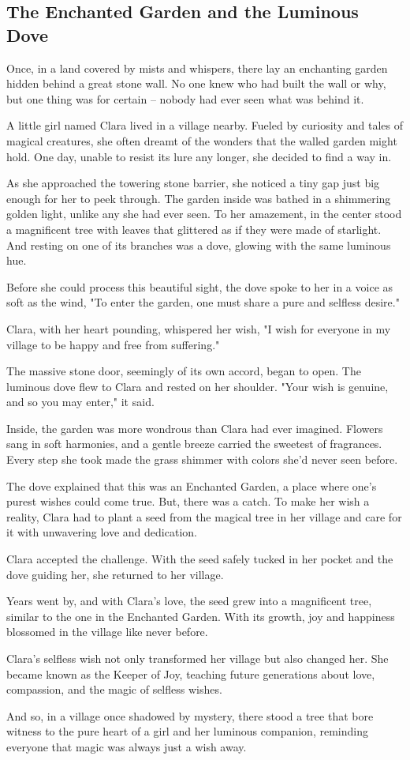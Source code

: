 \documentclass[10pt, letterpaper]{article}
\begin{document}
\subsection*{The Enchanted Garden and the Luminous Dove}

Once, in a land covered by mists and whispers, there lay an enchanting garden hidden behind a great stone wall. No one knew who had built the wall or why, but one thing was for certain – nobody had ever seen what was behind it.

A little girl named Clara lived in a village nearby. Fueled by curiosity and tales of magical creatures, she often dreamt of the wonders that the walled garden might hold. One day, unable to resist its lure any longer, she decided to find a way in.

As she approached the towering stone barrier, she noticed a tiny gap just big enough for her to peek through. The garden inside was bathed in a shimmering golden light, unlike any she had ever seen. To her amazement, in the center stood a magnificent tree with leaves that glittered as if they were made of starlight. And resting on one of its branches was a dove, glowing with the same luminous hue.

Before she could process this beautiful sight, the dove spoke to her in a voice as soft as the wind, "To enter the garden, one must share a pure and selfless desire."

Clara, with her heart pounding, whispered her wish, "I wish for everyone in my village to be happy and free from suffering."

The massive stone door, seemingly of its own accord, began to open. The luminous dove flew to Clara and rested on her shoulder. "Your wish is genuine, and so you may enter," it said.

Inside, the garden was more wondrous than Clara had ever imagined. Flowers sang in soft harmonies, and a gentle breeze carried the sweetest of fragrances. Every step she took made the grass shimmer with colors she'd never seen before.

The dove explained that this was an Enchanted Garden, a place where one’s purest wishes could come true. But, there was a catch. To make her wish a reality, Clara had to plant a seed from the magical tree in her village and care for it with unwavering love and dedication.

Clara accepted the challenge. With the seed safely tucked in her pocket and the dove guiding her, she returned to her village.

Years went by, and with Clara's love, the seed grew into a magnificent tree, similar to the one in the Enchanted Garden. With its growth, joy and happiness blossomed in the village like never before.

Clara's selfless wish not only transformed her village but also changed her. She became known as the Keeper of Joy, teaching future generations about love, compassion, and the magic of selfless wishes.

And so, in a village once shadowed by mystery, there stood a tree that bore witness to the pure heart of a girl and her luminous companion, reminding everyone that magic was always just a wish away.
\end{document}
